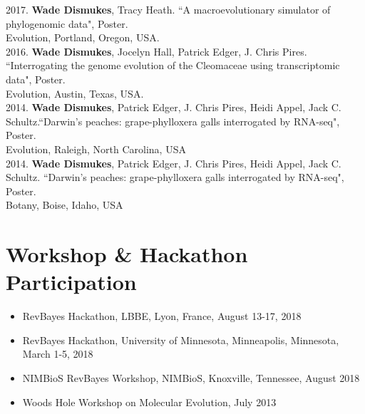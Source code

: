 \documentclass[12pt]{article}
\begin{document}
2017. \textbf{Wade Dismukes}, Tracy Heath. ``A macroevolutionary simulator of phylogenomic data", Poster.\\ Evolution, Portland, Oregon, USA. \\

2016. \textbf{Wade Dismukes}, Jocelyn Hall, Patrick Edger, J. Chris Pires. ``Interrogating the genome evolution of the Cleomaceae using transcriptomic data", Poster. \\
Evolution, Austin, Texas, USA. \\

2014. \textbf{Wade Dismukes}, Patrick Edger, J. Chris Pires, Heidi Appel, Jack C. Schultz.``Darwin's peaches: grape-phylloxera galls interrogated by RNA-seq", Poster. \\
Evolution, Raleigh, North Carolina, USA  \\

2014. \textbf{Wade Dismukes}, Patrick Edger, J. Chris Pires, Heidi Appel, Jack C. Schultz. ``Darwin's peaches: grape-phylloxera galls interrogated by RNA-seq", Poster. \\
Botany, Boise, Idaho, USA \\


\section{Workshop \& Hackathon Participation}
\begin{itemize}
    \item RevBayes Hackathon, LBBE, Lyon, France, August 13-17, 2018
    \item RevBayes Hackathon, University of Minnesota, Minneapolis, Minnesota, March 1-5, 2018
    \item NIMBioS RevBayes Workshop, NIMBioS, Knoxville, Tennessee, August 2018
    \item Woods Hole Workshop on Molecular Evolution, July 2013
\end{itemize}
\end{document}
